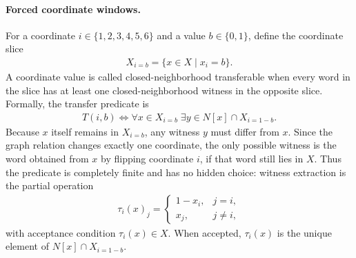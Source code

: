 \paragraph{Forced coordinate windows.}
For a coordinate $i\in\{1,2,3,4,5,6\}$ and a value $b\in\{0,1\}$, define the coordinate slice
$$
\begin{aligned}
X_{i=b}=\{x\in X\mid x_i=b\}.
\end{aligned}
$$
A coordinate value is called closed-neighborhood transferable when every word in the slice has at least one closed-neighborhood witness in the opposite slice.  Formally, the transfer predicate is
$$
\begin{aligned}
T(i,b)\Longleftrightarrow \forall x\in X_{i=b}\;\exists y\in N[x]\cap X_{i=1-b}.
\end{aligned}
$$
Because $x$ itself remains in $X_{i=b}$, any witness $y$ must differ from $x$.  Since the graph relation changes exactly one coordinate, the only possible witness is the word obtained from $x$ by flipping coordinate $i$, if that word still lies in $X$.  Thus the predicate is completely finite and has no hidden choice: witness extraction is the partial operation
$$
\begin{aligned}
\tau_i(x)_j=\begin{cases}1-x_i,&j=i,\\x_j,&j\ne i,\end{cases}
\end{aligned}
$$
with acceptance condition $\tau_i(x)\in X$.  When accepted, $\tau_i(x)$ is the unique element of $N[x]\cap X_{i=1-b}$.

